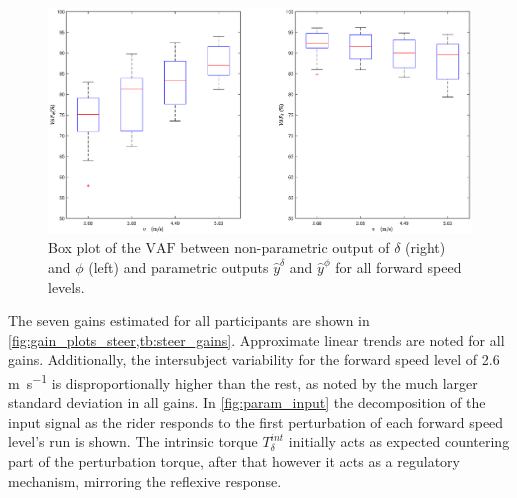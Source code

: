  \begin{figure}[h!]
    \centering
 
    \includegraphics[width=\linewidth]{images/steer_irf/param_fit_box.eps}
    \caption{Box plot of the  \ensuremath{\mathrm{VAF}} between non-parametric output  of \ensuremath{\delta} (right) and \ensuremath{\phi} (left) and  parametric outputs \ensuremath{\hat{y}^\delta} and \ensuremath{\hat{y}^\phi}  for all forward speed levels.}
    \label{fig:FIT_model}
\end{figure}
The seven gains estimated for all participants are shown in \cref{fig:gain_plots_steer,tb:steer_gains}. Approximate linear trends are noted for all gains. Additionally, the intersubject variability for the forward speed level of 2.6 \si{\meter\per\second} is disproportionally higher than the rest, as noted by the much larger standard deviation in all gains. In \cref{fig:param_input} the decomposition of the input signal as the rider responds to the first perturbation of each forward speed level's run is shown. The intrinsic torque \ensuremath{T_\delta^{int}} initially acts as expected countering part of the perturbation torque, after that however it acts as a  regulatory mechanism, mirroring the reflexive response.
 
